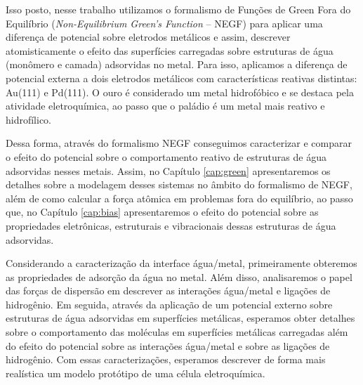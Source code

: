 
Isso posto, nesse trabalho utilizamos o formalismo de Funções de Green Fora do Equilíbrio (\textit{Non-Equilibrium Green's Function} -- NEGF) para aplicar uma diferença de potencial sobre eletrodos metálicos e assim, descrever atomisticamente o efeito das superfícies carregadas sobre estruturas de água (monômero e camada) adsorvidas no metal. Para isso, aplicamos a diferença de potencial externa a dois eletrodos metálicos com características reativas distintas: Au(111) e Pd(111). O ouro é considerado um metal hidrofóbico e se destaca pela atividade eletroquímica, ao passo que o paládio é um metal mais reativo e hidrofílico. 

Dessa forma, através do formalismo NEGF conseguimos caracterizar e comparar o efeito do potencial sobre o comportamento reativo de estruturas de água adsorvidas nesses metais. Assim, no Capítulo \ref{cap:green} apresentaremos os detalhes sobre a modelagem desses sistemas no âmbito do formalismo de NEGF, além de como calcular a força atômica em problemas fora do equilíbrio, ao passo que, no Capítulo \ref{cap:bias} apresentaremos o efeito do potencial sobre as propriedades eletrônicas, estruturais e vibracionais dessas estruturas de água adsorvidas.

Considerando a caracterização da interface água/metal, primeiramente obteremos as propriedades de adsorção da água no metal. Além disso, analisaremos o papel das forças de dispersão em descrever as interações água/metal e ligações de hidrogênio. Em seguida, através da aplicação de um potencial externo sobre estruturas de água adsorvidas em superfícies metálicas, esperamos obter detalhes sobre o comportamento das moléculas em superfícies metálicas carregadas além do efeito do potencial sobre as interações água/metal e sobre as ligações de hidrogênio. Com essas caracterizações, esperamos descrever de forma mais realística um modelo protótipo de uma célula eletroquímica.

